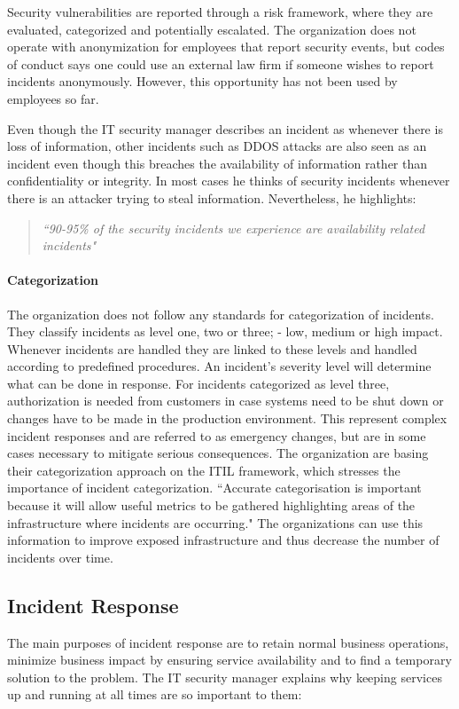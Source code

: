Security vulnerabilities are reported through a risk framework, where they are evaluated, categorized and potentially escalated. The organization does not operate with anonymization for employees that report security events, but codes of conduct says one could use an external law firm if someone wishes to report incidents anonymously. However, this opportunity has not been used by employees so far. 

Even though the IT security manager describes an incident as whenever there is loss of information, other incidents such as DDOS attacks are also seen as an incident even though this breaches the availability of information rather than confidentiality or integrity. In most cases he thinks of security incidents whenever there is an attacker trying to steal information. Nevertheless, he highlights:

\begin{quote}
\textit{``90-95\% of the security incidents we experience are availability related incidents"}
\end{quote}

\paragraph{Categorization}
The organization does not follow any standards for categorization of incidents. They classify incidents as level one, two or three; - low, medium or high impact. Whenever incidents are handled they are linked to these levels and handled according to predefined procedures. An incident's severity level will determine what can be done in response. For incidents categorized as level three, authorization is needed from customers in case systems need to be shut down or changes have to be made in the production environment. This represent complex incident responses and are referred to as emergency changes, but are in some cases necessary to mitigate serious consequences. 
The organization are basing their categorization approach on the ITIL framework, which stresses the importance of incident categorization. ``Accurate categorisation is important because it will allow useful metrics to be gathered highlighting areas of the infrastructure where incidents are occurring\cite{itilbok}." The organizations can use this information to improve exposed infrastructure and thus decrease the number of incidents over time.

\subsection{Incident Response}
The main purposes of incident response are to retain normal business operations, minimize business impact by ensuring service availability and to find a temporary solution to the problem. The IT security manager explains why keeping services up and running at all times are so important to them:

